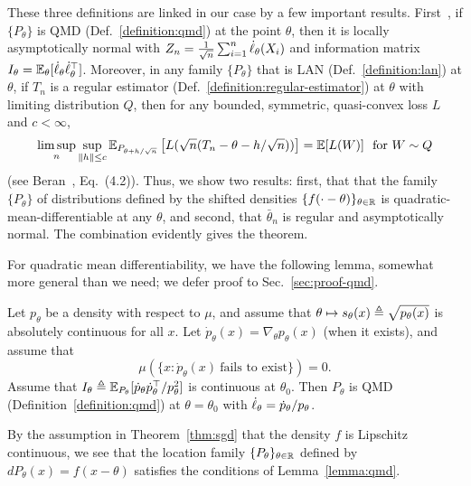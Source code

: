 These three definitions are linked in our case by a few important results.
First~\cite[Theorem 7.2]{VanDerVaart98}, if $\{P_\theta\}$ is QMD
(Def.~\ref{definition:qmd}) at the point $\theta$, then it is locally
asymptotically normal with $Z_n = \frac{1}{\sqrt{n}} \sum_{i = 1}^n
\dot{\ell}_\theta(X_i)$ and information matrix $I_\theta =
\mathbb{E}_\theta[\dot{\ell}_\theta \dot{\ell}_\theta^\top]$. Moreover, in any family
$\{P_\theta\}$ that is LAN (Def.~\ref{definition:lan}) at $\theta$, if $T_n$
is a regular estimator (Def.~\ref{definition:regular-estimator}) at $\theta$
with limiting distribution $Q$, then for any bounded, symmetric,
quasi-convex loss $L$ and $c < \infty$,
\begin{equation}
  \label{eqn:limit-law-regular}
  \limsup_n \sup_{\left\|{h}\right\| \le c}
  \mathbb{E}_{P_{\theta + h/\sqrt{n}}}
  \left[L(\sqrt{n}(T_n - \theta - h / \sqrt{n}))\right]
  = \mathbb{E}[L(W)] ~~ \mbox{for~}W \sim Q
\end{equation}
(see Beran~\cite{beran1995role}, Eq.~(4.2)).
%
Thus, we show two results: first, that
that the family $\{P_\theta\}$ of distributions
defined by the shifted densities $\{f(\cdot - \theta)\}_{\theta \in \mathbb{R}}$
is quadratic-mean-differentiable at any $\theta$,
and second, that $\bar{\theta}_n$ is regular and
asymptotically normal.
The combination evidently gives the theorem.

For quadratic mean differentiability, we have the following lemma, somewhat
more general than we need; we defer proof to Sec.~\ref{sec:proof-qmd}.
\begin{lemma}
  \label{lemma:qmd}
  Let $p_\theta$ be a density with respect to $\mu$,
  and assume that $\theta \mapsto s_\theta(x) \triangleq \sqrt{p_\theta(x)}$
  is absolutely continuous for all $x$. Let
  $\dot{p}_\theta(x) = \nabla_\theta p_\theta(x)$ (when it exists),
  and assume that
  \begin{equation*}
    \mu(\{x : \dot{p}_\theta(x) ~ \mbox{fails~to~exist}\}) = 0.
  \end{equation*}
  Assume that $I_\theta \triangleq \mathbb{E}_{P_\theta}[\dot{p}_\theta
    \dot{p}_\theta^\top / p_\theta^2]$ is continuous at $\theta_0$. Then
  $P_\theta$ is QMD (Definition~\ref{definition:qmd}) at $\theta = \theta_0$
  with $\dot{\ell}_\theta = \dot{p}_\theta / p_\theta$.
\end{lemma}

By the assumption in Theorem~\ref{thm:sgd} that the density $f$
is Lipschitz continuous, we see that the location family
$\{P_\theta\}_{\theta \in \mathbb{R}}$ defined by $dP_\theta(x) = f(x - \theta)$
satisfies the conditions of Lemma~\ref{lemma:qmd}.

